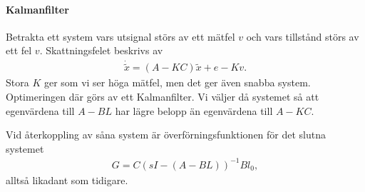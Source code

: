 \paragraph{Kalmanfilter}
Betrakta ett system vars utsignal störs av ett mätfel $v$ och vars tillstånd störs av ett fel $v$. Skattningsfelet beskrivs av
\begin{align*}
	\dot{\tilde{x}} = (A - KC)\tilde{x} + e - Kv.
\end{align*}
Stora $K$ ger som vi ser höga mätfel, men det ger även snabba system. Optimeringen där görs av ett Kalmanfilter. Vi väljer då systemet så att egenvärdena till $A - BL$ har lägre belopp än egenvärdena till $A - KC$.

Vid återkoppling av såna system är överförningsfunktionen för det slutna systemet
\begin{align*}
	G = C(sI - (A - BL))^{-1}Bl_{0},
\end{align*}
alltså likadant som tidigare.